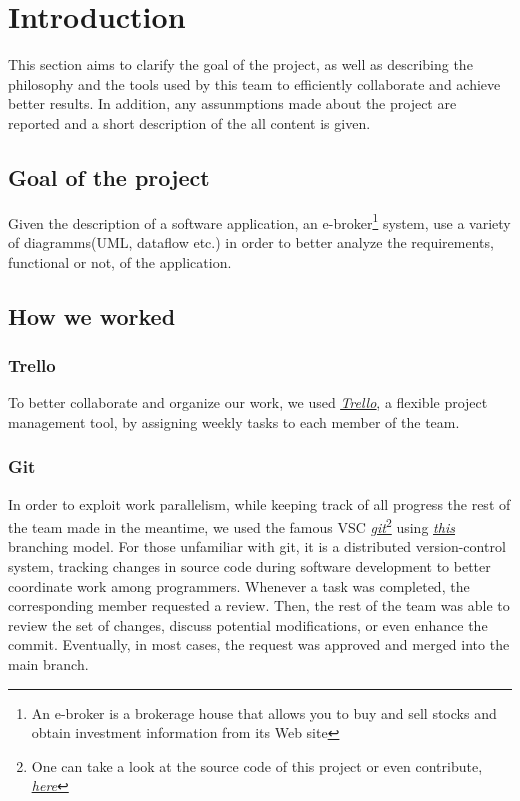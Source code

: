 \documentclass{article}
\begin{document}
\tableofcontents
\newpage
\section{Introduction}
This section aims to clarify the goal of the project, as well as describing the philosophy and the tools used by this team to efficiently collaborate and achieve better results. In addition, any assunmptions made about the project are reported and a short description of the all content is given.
\subsection{Goal of the project}
Given the description of a software application, an e-broker\footnote{An e-broker is a brokerage house that allows you to buy and sell stocks and obtain investment information from its Web site} system, use a variety of diagramms(UML, dataflow etc.) in order to better analyze the requirements, functional or not, of the application. 
\subsection{How we worked}

\subsubsection{Trello}
To better collaborate and organize our work, we used \href{https://trello.com}{\underline{\textit{Trello}}}, a flexible project management tool, by assigning weekly tasks to each member of the team.

\subsubsection{Git}
In order to exploit work parallelism, while keeping track of all progress the rest of the team made in the meantime, we used the famous VSC \href{https://github.com/}{\underline{\emph{git}}}\footnote{One can take a look at the source code of this project or even contribute, \href{https://github.com/KostasKoyias/Software_Analysis}{\underline{\textit{here}}}} using \href{https://nvie.com/files/Git-branching-model.pdf}{\underline{\emph{this}}} branching model. For those unfamiliar with git, it is a distributed version-control system, tracking changes in source code during software development to better coordinate work among programmers. Whenever a task was completed, the corresponding member requested a review. Then, the rest of the team was able to review the set of changes, discuss potential modifications, or even enhance the commit. Eventually, in most cases, the request was approved and merged into the main branch.
\end{document}

